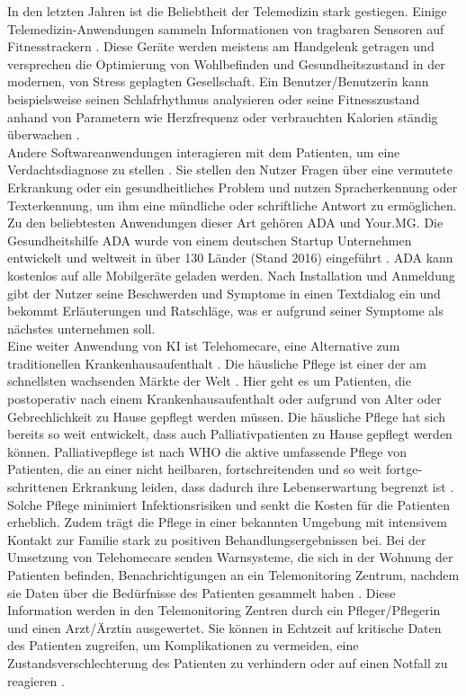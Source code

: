 In den letzten Jahren ist die Beliebtheit der Telemedizin stark gestiegen. Einige Telemedizin-Anwendungen sammeln Informationen von tragbaren Sensoren auf Fitnesstrackern \cite{Opportunities_challenges_ai_hc}. Diese Geräte werden meistens am Handgelenk getragen und versprechen die Optimierung von Wohlbefinden und Gesundheitszustand in der modernen, von Stress geplagten Gesellschaft. Ein Benutzer/Benutzerin kann beispielsweise seinen Schlafrhythmus analysieren oder seine Fitnesszustand anhand von Parametern wie Herzfrequenz oder verbrauchten Kalorien ständig überwachen \cite{Opportunities_challenges_ai_hc}. \\
Andere Softwareanwendungen interagieren mit dem Patienten, um eine Verdachtsdiagnose zu stellen  \cite{Opportunities_challenges_ai_hc}. Sie stellen den Nutzer Fragen über eine vermutete Erkrankung oder ein gesundheitliches Problem und nutzen Spracherkennung oder Texterkennung, um ihm eine mündliche oder schriftliche Antwort zu ermöglichen.
Zu den beliebtesten Anwendungen dieser Art gehören ADA und Your.MG. Die Gesundheitshilfe ADA wurde von einem deutschen Startup Unternehmen entwickelt und weltweit in über 130 Länder (Stand 2016) eingeführt \cite{Opportunities_challenges_ai_hc}. ADA kann kostenlos auf alle Mobilgeräte geladen werden. Nach Installation und Anmeldung gibt der Nutzer seine Beschwerden und Symptome in einen Textdialog ein und bekommt Erläuterungen und Ratschläge, was er aufgrund seiner Symptome als nächstes unternehmen soll.\\
Eine weiter Anwendung von KI ist Telehomecare, eine Alternative zum traditionellen Krankenhausaufenthalt \cite{Chapter_14}. Die häusliche Pflege ist einer der am schnellsten wachsenden Märkte der Welt \cite{Chapter_14}. Hier geht es um Patienten, die postoperativ nach einem Krankenhausaufenthalt oder aufgrund von Alter oder Gebrechlichkeit zu Hause gepflegt werden müssen. Die häusliche Pflege hat sich bereits so weit entwickelt, dass auch Palliativpatienten zu Hause gepflegt werden können. Palliativepflege ist nach WHO die aktive um­fassen­de Pflege von Patienten, die an ei­ner nicht heil­baren, fort­schreiten­den und so weit fort­ge­schritte­nen Erkrankung leiden, dass dadurch ih­re Le­bens­er­wartung be­grenzt ist \cite{Pschyrembel}. Solche Pflege minimiert Infektionsrisiken und senkt die Kosten für die Patienten erheblich. Zudem trägt die Pflege in einer bekannten Umgebung mit intensivem Kontakt zur Familie stark zu positiven Behandlungsergebnissen bei.
Bei der Umsetzung von Telehomecare senden Warnsysteme, die sich in der Wohnung der Patienten befinden, Benachrichtigungen an ein Telemonitoring Zentrum, nachdem sie Daten über die Bedürfnisse des Patienten gesammelt haben \cite{Chapter_14}. Diese Information werden in den Telemonitoring Zentren durch ein Pfleger/Pflegerin und einen Arzt/Ärztin ausgewertet. Sie können in Echtzeit auf kritische Daten des Patienten zugreifen, um Komplikationen zu vermeiden, eine Zustandsverschlechterung des Patienten zu verhindern oder auf einen Notfall zu reagieren \cite{Chapter_14}.\\
